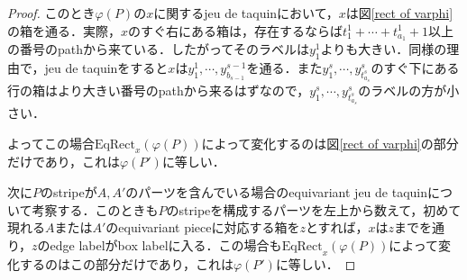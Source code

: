 \begin{proof}
  

  このとき$\varphi(P)$の$x$に関するjeu de taquinにおいて，$x$は図\ref{rect of varphi}の箱を通る．実際，$x$のすぐ右にある箱は，存在するならば$t^1_1+\cdots+t^1_{a_1}+1$以上の番号のpathから来ている．したがってそのラベルは$y^1_1$よりも大きい．同様の理由で，jeu de taquinをすると$x$は$y^1_1,\cdots,y^{s-1}_{b_{s-1}}$を通る．また$y^s_1,\cdots,y^s_{t^s_{a_s}}$のすぐ下にある行の箱はより大きい番号のpathから来るはずなので，$y^s_1,\cdots,y^s_{t^s_{a_s}}$のラベルの方が小さい．

  よってこの場合$\text{EqRect}_x(\varphi(P))$によって変化するのは図\ref{rect of varphi}の部分だけであり，これは$\varphi(P')$に等しい．

  次に$P$のstripeが$A,A'$のパーツを含んでいる場合のequivariant jeu de taquinについて考察する．このときも$P$のstripeを構成するパーツを左上から数えて，初めて現れる$A$または$A'$のequivariant pieceに対応する箱を$z$とすれば，$x$は$z$までを通り，$z$のedge labelがbox labelに入る．この場合も$\text{EqRect}_x(\varphi(P))$によって変化するのはこの部分だけであり，これは$\varphi(P')$に等しい．
\end{proof}

